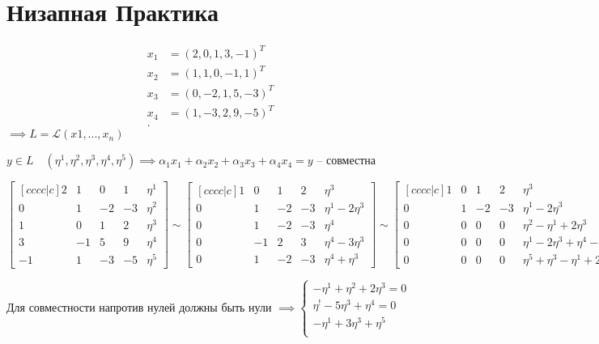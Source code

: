 \documentclass{book}
\theoremstyle{definition}
\begin{document}
\section{Низапная Практика}

    \begin{align*}
        x_1&= \left(2,0,1,3,-1 \right)^T  \\
        x_2&= \left( 1,1,0,-1,1 \right)^T  \\
        x_3&= \left( 0,-2,1,5,-3 \right)^T  \\
        x_4&= \left( 1,-3,2,9,-5\right)^T  \\
    .\end{align*} $\implies  L = \mathscr{L}(x1, ..., x_n)$

    $y\in L\quad \left( \eta^1, \eta^2, \eta^3, \eta^4, \eta^5 \right) \implies  \alpha_1x_1 + \alpha_2x_2 + \alpha_3x_3 + \alpha_4x_4 = y$ -- совместна

    $\begin{bmatrix} [c c c c|c ] 2&1&0&1&\eta^1\\ 0&1&-2&-3&\eta^2 \\ 1&0&1&2&\eta^3\\ 3&-1&5&9&\eta^4\\ -1&1&-3&-5&\eta^5 \end{bmatrix} \sim \begin{bmatrix} [c c c c|c] 1&0&1&2&\eta^3\\0&1&-2&-3&\eta^1-2\eta^3 \\ 0&1&-2&-3&\eta^4\\0&-1&2&3&\eta^4-3\eta^3\\ 0&1&-2&-3&\eta^4+\eta^3 \end{bmatrix} \sim \begin{bmatrix} [c c c c|c] 1&0&1&2&\eta^3\\ 0&1&-2&-3&\eta^1-2\eta^3\\0&0&0&0&\eta^2-\eta^1+2\eta^3\\ 0&0&0&0&\eta^1-2\eta^3+\eta^4-3\eta^3\\0&0&0&0&\eta^5+\eta^3-\eta^1+2\eta^3 \end{bmatrix}  $

    Для совместности напротив нулей должны быть нули $\implies  \begin{cases}
        -\eta^1+\eta^2+2\eta^3 = 0\\
        \eta^!-5\eta^3+\eta^4 = 0\\
        -\eta^1+3\eta^3+\eta^5\\
    \end{cases}$ 
\end{document}
